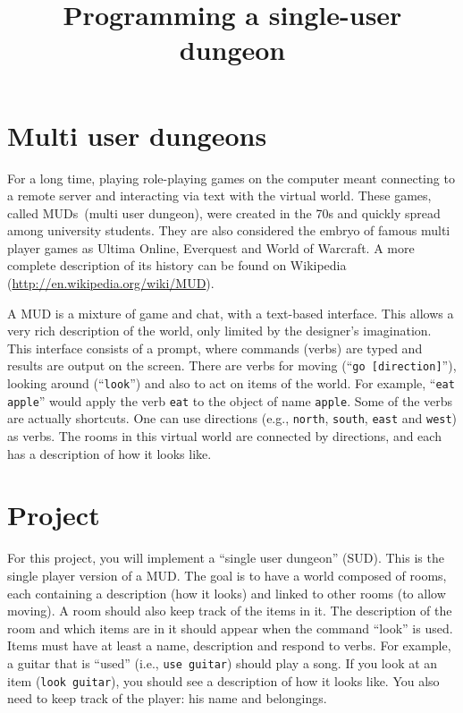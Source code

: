 \documentclass[smallheadings,12pt]{scrartcl}
\newcommand{\cmd}[1]{\texttt{#1}}
\begin{document}
\parindent1cm
\pagestyle{myheadings}
\title{Programming a single-user dungeon}
\lstset{language=Python,numbers=left,frame=shadowbox}

\maketitle

\section*{Multi user dungeons}

For a long time, playing role-playing games on the computer meant connecting to a
remote server and interacting via text with the virtual world. These games, called MUDs~(multi user dungeon), were created in the 70s and quickly spread among university students.  
They are also considered the embryo of famous multi player games as Ultima Online, Everquest
and World of Warcraft. A more complete description of its history can be found
on Wikipedia (\url{http://en.wikipedia.org/wiki/MUD}). 

A MUD is a mixture of game and chat, with a text-based interface. This allows a very rich description
of the world, only limited by the designer's imagination. This interface consists of a prompt, where
commands (verbs) are typed and results are output on the screen. There are verbs for moving 
(``\cmd{go [direction]}''), looking around (``\cmd{look}'') and also to act on items of the world. 
For example, ``\cmd{eat apple}'' would apply the verb \cmd{eat} to the object of name \cmd{apple}.
Some of the verbs are actually shortcuts. One can use directions (e.g., \cmd{north}, \cmd{south},
\cmd{east} and \cmd{west}) as verbs. The rooms in this virtual world are connected by directions,
and each has a description of how it looks like.

\section*{Project}

For this project, you will implement a ``single user dungeon'' (SUD). This is the single player version of a MUD. 
The goal is to have a world composed of rooms, each containing a description (how it looks) and linked to other
rooms (to allow moving). A room should also keep track of the items in it. The description of the room and
which items are in it should appear when the command ``look'' is used. Items must have at least a name,
description and respond to verbs. For example, a guitar that is ``used'' (i.e., \cmd{use guitar}) should
play a song. If you look at an item (\cmd{look guitar}), you should see a description of how it looks like. 
You also need to keep track of the player: his name and belongings. 
\end{document}
